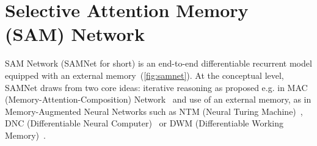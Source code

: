 \section{Selective Attention Memory (SAM) Network}




SAM Network (SAMNet for short) is an end-to-end differentiable recurrent model equipped with an external memory~(\cref{fig:samnet}). At the conceptual level, SAMNet draws from two core ideas:
iterative reasoning as proposed e.g. in MAC (Memory-Attention-Composition) Network~\cite{hudson2018compositional,marois2018transfer} and use of an external memory, as in Memory-Augmented Neural Networks such as NTM (Neural Turing Machine)~\cite{graves2014neural}, DNC (Differentiable Neural Computer)~\cite{graves2016hybrid} or DWM (Differentiable Working Memory)~\cite{jayram2018learning}.

